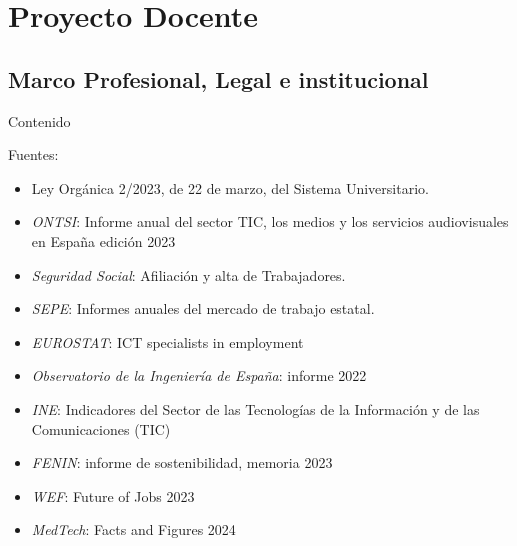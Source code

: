 \documentclass[xcolor=table,xcolor=x11names]{beamer}
\begin{document}
\section{Proyecto Docente}
\subsection{Marco Profesional, Legal e institucional}
\begin{frame}[allowframebreaks]{Contenido}
    \tableofcontents[currentsubsection]
\end{frame}


\begin{frame}{\subsecname}
    Fuentes:
    \begin{itemize}
        \item Ley Orgánica 2/2023, de 22 de marzo, del Sistema Universitario.
        \item \emph{ONTSI}: Informe anual del sector TIC, los medios y los servicios audiovisuales en España edición 2023
        \item \emph{Seguridad Social}: Afiliación y alta de Trabajadores.
        \item \emph{SEPE}: Informes anuales del mercado de trabajo estatal.
        \item \emph{EUROSTAT}: ICT specialists in employment
        \item \emph{Observatorio de la Ingeniería de España}: informe 2022
        \item \emph{INE}: Indicadores del Sector de las Tecnologías de la Información y de las Comunicaciones (TIC)
        \item \emph{FENIN}: informe de sostenibilidad, memoria 2023
        \item \emph{WEF}: Future of Jobs 2023
        \item \emph{MedTech}: Facts and Figures 2024
    \end{itemize}
\end{frame}
\end{document}

